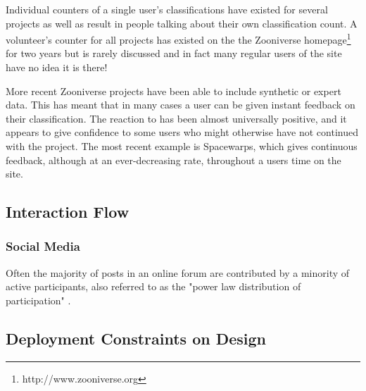 \documentclass{sigchi}
\begin{document}
Individual counters of a single user's classifications have existed for several projects as well as result in people talking about their own classification count. A volunteer's counter for all projects has existed on the the Zooniverse homepage\footnote{http://www.zooniverse.org} for two years but is rarely discussed and in fact many regular users of the site have no idea it is there!

More recent Zooniverse projects have been able to include synthetic or expert data. This has meant that in many cases a user can be given instant feedback on their classification. The reaction to has been almost universally positive, and it appears to give confidence to some users who might otherwise have not continued with the project. The most recent example is Spacewarps, which gives continuous feedback, although at an ever-decreasing rate, throughout a users time on the site.



\subsection{Interaction Flow}

\subsubsection{Social Media}
Often the majority of posts in an online forum are contributed by a minority of active participants, also referred to as the "power law distribution of participation" \cite{lampe2010motivations}. 

\subsection{Deployment Constraints on Design}
\end{document}
